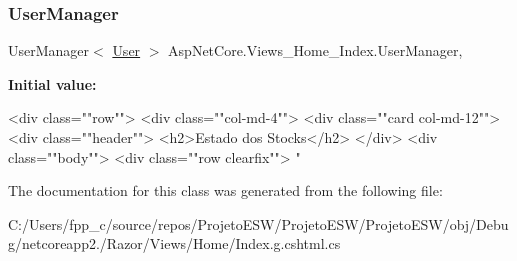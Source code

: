 \subsubsection{\texorpdfstring{User\+Manager}{UserManager}}
{\footnotesize\ttfamily User\+Manager$<$ \mbox{\hyperlink{class_projeto_e_s_w_1_1_models_1_1_user}{User}} $>$ Asp\+Net\+Core.\+Views\+\_\+\+Home\+\_\+\+Index.\+User\+Manager\hspace{0.3cm}{\ttfamily [get]}, {}}

{\bfseries Initial value\+:}
\begin{DoxyCode}
    <div \textcolor{keyword}{class}=\textcolor{stringliteral}{""}row\textcolor{stringliteral}{""}>
        <div \textcolor{keyword}{class}=\textcolor{stringliteral}{""}col-md-4\textcolor{stringliteral}{""}>
            <div \textcolor{keyword}{class}=\textcolor{stringliteral}{""}card col-md-12\textcolor{stringliteral}{""}>
                <div \textcolor{keyword}{class}=\textcolor{stringliteral}{""}header\textcolor{stringliteral}{""}>
                    <h2>Estado dos Stocks</h2>
                </div>
                <div \textcolor{keyword}{class}=\textcolor{stringliteral}{""}body\textcolor{stringliteral}{""}>
                    <div \textcolor{keyword}{class}=\textcolor{stringliteral}{""}row clearfix\textcolor{stringliteral}{""}>
\textcolor{stringliteral}{"}
\end{DoxyCode}


The documentation for this class was generated from the following file\+:\begin{DoxyCompactItemize}
\item 
C\+:/\+Users/fpp\+\_\+c/source/repos/\+Projeto\+E\+S\+W/\+Projeto\+E\+S\+W/\+Projeto\+E\+S\+W/obj/\+Debug/netcoreapp2./\+Razor/\+Views/\+Home/Index.\+g.\+cshtml.\+cs\end{DoxyCompactItemize}
